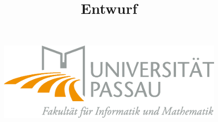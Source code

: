 \documentclass[10pt]{scrreprt}
\begin{document}
\thispagestyle{empty}
\sffamily
 
\title{Entwurf}

\begin{figure}
\begin{flushright}
	\includegraphics[scale=0.4]{uniLogo.eps}
\vspace{2.0 cm}
\end{flushright}
\end{figure}
\end{document}
